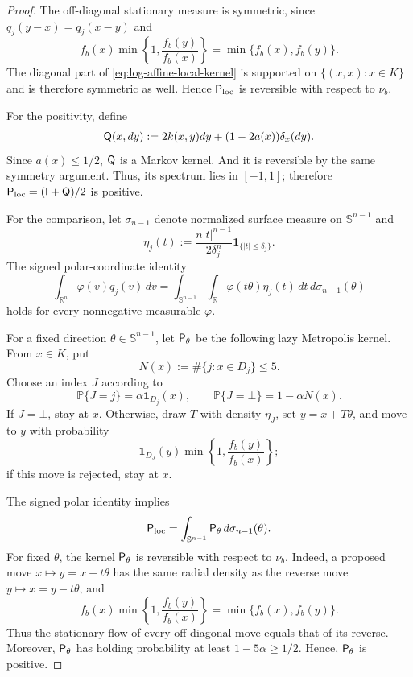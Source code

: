 \documentclass[11pt]{article}
\theoremstyle{definition}
\theoremstyle{remark}
\newcommand{\Prb}{\mathbb P}
\newcommand{\R}{\mathbb R}
\newcommand{\one}{\mathbf 1}
\newcommand{\Id}{\mathsf I}
\begin{document}
\begin{proof}
The off-diagonal stationary measure is symmetric, since $q_j(y-x)=q_j(x-y)$ and
\[
 f_b(x)\min\left\{1,\frac{f_b(y)}{f_b(x)}\right\}
 =
 \min\{f_b(x),f_b(y)\}.
\]
The diagonal part of
\eqref{eq:log-affine-local-kernel} is supported on
$\{(x,x):x\in K\}$ and is therefore symmetric as well.  Hence
${\sf P}_{\rm loc}$ is reversible with respect to $\nu_b$.

For the positivity, define
\begin{align*}
    {\sf Q}(x,dy):=2k(x,y)dy+(1-2a(x))\delta_x(dy).
\end{align*}
Since $a(x)\leq 1/2$, ${\sf Q}$ is a Markov kernel. And it is reversible by the same symmetry argument. Thus, its spectrum lies in $[-1,1]$; therefore ${\sf P}_{\rm loc}=(\Id+{\sf Q})/2$ is positive.

For the comparison, let $\sigma_{n-1}$ denote normalized surface measure on $\mathbb S^{n-1}$ and
\[
 \eta_j(t)
 :=
 \frac{n|t|^{n-1}}{2\delta_j^n}
 \one_{\{|t|\le\delta_j\}}.
\]
The signed polar-coordinate identity
\begin{equation}\label{eq:signed-polar-integral}
 \int_{\R^n}\varphi(v)q_j(v)\,dv
 =
 \int_{\mathbb S^{n-1}}\int_{\R}
 \varphi(t\theta)\eta_j(t)\,dt\,
 d\sigma_{n-1}(\theta)
\end{equation}
holds for every nonnegative measurable $\varphi$.

For a fixed direction $\theta\in\mathbb S^{n-1}$, let
${\sf P}_\theta$ be the following lazy Metropolis kernel.  From
$x\in K$, put
\[
 N(x):=\#\{j:x\in D_j\}\le5.
\]
Choose an index $J$ according to
\[
 \Prb\{J=j\}
 =
 \alpha\one_{D_j}(x),
 \qquad
 \Prb\{J=\bot\}
 =
 1-\alpha N(x).
\]
If $J=\bot$, stay at $x$.  Otherwise, draw $T$ with density
$\eta_J$, set $y=x+T\theta$, and move to $y$ with probability
\[
 \one_{D_J}(y)
 \min\left\{1,\frac{f_b(y)}{f_b(x)}\right\};
\]
if this move is rejected, stay at $x$.

The signed polar identity implies
\begin{equation}\label{eq:local-kernel-direction-average}
 {\sf P}_{\rm loc}
 =
 \int_{\mathbb S^{n-1}}
 {\sf P}_\theta\,d\sigma_{n-1}(\theta).
\end{equation}
For fixed $\theta$, the kernel ${\sf P}_\theta$ is reversible with
respect to $\nu_b$.  Indeed, a proposed move $x\mapsto y=x+t\theta$
has the same radial density as the reverse move
$y\mapsto x=y-t\theta$, and
\[
 f_b(x)\min\left\{1,\frac{f_b(y)}{f_b(x)}\right\}
 =
 \min\{f_b(x),f_b(y)\}.
\]
Thus the stationary flow of every off-diagonal move equals that of its reverse. Moreover, ${\sf P}_\theta$ has holding probability at least $1-5\alpha \geq 1/2$.
Hence, ${\sf P}_\theta$ is positive.


\end{proof}
\end{document}
